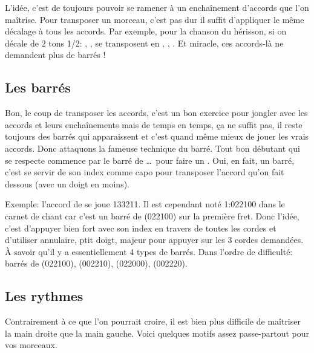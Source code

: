 \documentclass[versionenligne]{framabook}
\begin{document}
L'idée, c'est de toujours pouvoir se ramener à un enchaînement
d'accords que l'on maîtrise.  Pour transposer un morceau, c'est pas
dur il suffit d'appliquer le même décalage à tous les accords.  Par
exemple, pour la chanson du hérisson, si on décale de 2 tons 1/2:
, ,  se transposent en
, , .  Et miracle, ces accords-là ne demandent plus de barrés !

\subsection{Les barrés}

Bon, le coup de transposer les accords, c'est un bon exercice pour
jongler avec les accords et leurs enchaînements mais de temps en
temps, ça ne suffit pas, il reste toujours des barrés qui apparaissent
et c'est quand même mieux de jouer les vrais accords. Donc attaquons
la fameuse technique du barré. Tout bon débutant qui se respecte
commence par le barré de  \dots\, pour faire un
. Oui, en fait, un barré, c'est se servir de son index comme
capo pour transposer l'accord qu'on fait dessous (avec un doigt en
moins).

Exemple: l'accord de  se joue 133211. Il est cependant
noté 1:022100 dans le carnet de chant car c'est un barré de
 (022100) sur la première fret.  Donc l'idée, c'est
d'appuyer bien fort avec son index en travers de toutes les cordes et
d'utiliser annulaire, ptit doigt, majeur pour appuyer sur les 3 cordes
demandées. À savoir qu'il y a essentiellement 4 types de barrés.  Dans
l'ordre de difficulté: barrés de  (022100), 
(002210),  (022000),  (002220).

\subsection{Les rythmes}

Contrairement à ce que l'on pourrait croire, il est bien plus
difficile de maîtriser la main droite que la main gauche.
Voici quelques motifs assez passe-partout pour vos morceaux.
\end{document}
